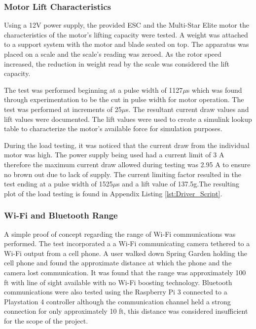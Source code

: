  \subsubsection{Motor Lift Characteristics}
 
 Using a 12V power supply, the provided ESC and the Multi-Star Elite motor the characteristics of the motor's lifting capacity were tested. A weight was attached to a support system with the motor and blade seated on top. The apparatus was placed on a scale and the scale's reading was zeroed. As the rotor speed increased, the reduction in weight read by the scale was considered the lift capacity.
 
 The test was performed beginning at a pulse width of 1127$\mu$s which was found through experimentation to be the cut in pulse width for motor operation. The test was performed at increments of 25$\mu$s. The resultant current draw values and lift values were documented. The lift values were used to create a simulink lookup table to characterize the motor's available force for simulation purposes. 
 
 During the load testing, it was noticed that the current draw from the individual motor was high. The power supply being used had a current limit of 3 A therefore the maximum current draw allowed during testing was 2.95 A to ensure no brown out due to lack of supply. The current limiting factor resulted in the test ending at a pulse width of 1525$\mu$s and a lift value of 137.5g.The resulting plot of the load testing is found in Appendix Listing \ref{lst:Driver_Script}.

  \subsubsection{Wi-Fi and Bluetooth Range}
  
  A simple proof of concept regarding the range of Wi-Fi communications was performed. The test incorporated a a Wi-Fi communicating camera tethered to a Wi-Fi output from a cell phone. A user walked down Spring Garden holding the cell phone and found the approximate distance at which the phone and the camera lost communication. It was found that the range was approximately 100 ft with line of sight available with no Wi-Fi boosting technology. Bluetooth communications were also tested using the Raspberry Pi 3 connected to a Playstation 4 controller although the communication channel held a strong connection for only approximately 10 ft, this distance was considered insufficient for the scope of the project.
  
